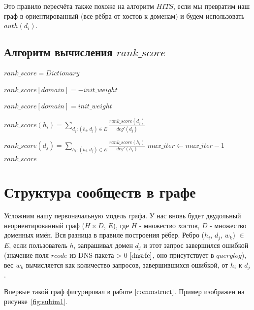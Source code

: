 \documentclass[a4paper,14pt]{extreport} %
\begin{document}
Это правило пересчёта также похоже на алгоритм $HITS$, если мы превратим наш граф в ориентированный (все рёбра от хостов к доменам) и будем использовать $auth(d_i)$.
	
\subsection{Алгоритм вычисления $rank\_score$}
\begin{algorithmic}
	\State $rank\_score = Dictionary$
				
	\State $rank\_score[domain] = -init\_weight$
	\EndFor
				
	\State $rank\_score[domain] = init\_weight$
	\EndFor
			
	\State $rank\_score(h_i) = \sum_{d_j: (h_i, d_j)\in E} \frac{rank\_score(d_j)}{deg'(d_j)}$
	\EndFor
					
	\State $rank\_score(d_j) = \sum_{h_i: (h_i, d_j)\in E} \frac{rank\_score(h_i)}{deg'(h_i)}$
	\EndFor
	\State $max\_iter\gets max\_iter-1$
	\EndWhile
	\State \Return $rank\_score$
	\EndFunction
\end{algorithmic}

\section{Структура сообществ в графе}
\label{ssec:communitystruct}
Усложним нашу первоначальную модель графа. У нас вновь будет двудольный неориентированный граф ($H\times D$, $E$), где $H$ - множество хостов, $D$ - множество доменных имён. Вся разница в правиле построения рёбер. Ребро ($h_i$, $d_j$, $w_k$) $\in$ $E$, если пользователь $h_i$ запрашивал домен $d_j$ и этот запрос завершился ошибкой (значение поля $rcode$ из DNS-пакета > 0 $\cite{dnsrfc}$, оно присутствует в $querylog$), вес $w_k$ вычисляется как количество запросов, завершившихся ошибкой, от $h_i$ к $d_j$. 

Впервые такой граф фигурировал в работе $\cite{commstruct}$. Пример изображен на рисунке~\ref{fig:subim1}. 
\end{document}
